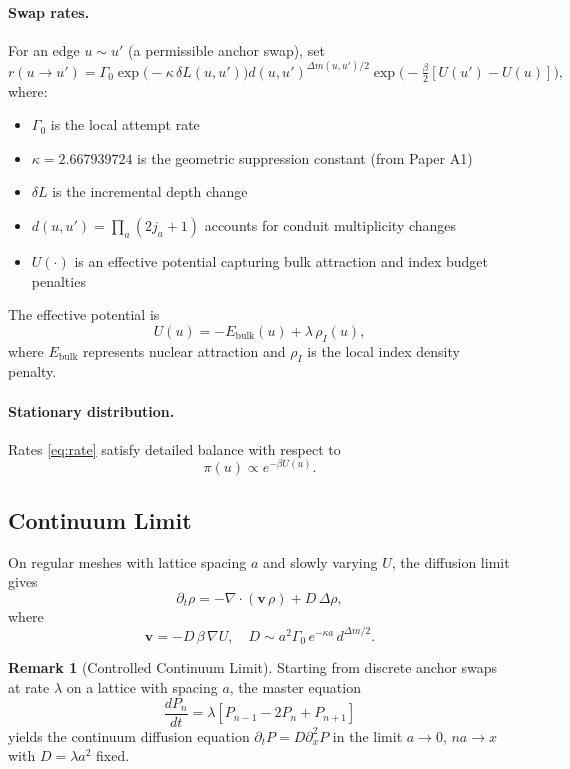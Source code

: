 \documentclass[11pt]{article}
\theoremstyle{plain}
\theoremstyle{definition}
\newtheorem{remark}[theorem]{Remark}
\begin{document}
\paragraph{Swap rates.}
For an edge $u\sim u'$ (a permissible anchor swap), set
\begin{equation}
  r(u\to u') = \Gamma_0 \exp\!\Big(-\kappa\,\delta L(u,u')\Big) d(u,u')^{\Delta m(u,u')/2} \exp\!\Big(-\tfrac{\beta}{2}[U(u')-U(u)]\Big),
  \label{eq:rate}
\end{equation}
where:
\begin{itemize}
  \item $\Gamma_0$ is the local attempt rate
  \item $\kappa = 2.667939724$ is the geometric suppression constant (from Paper A1)
  \item $\delta L$ is the incremental depth change
  \item $d(u,u')=\prod_a(2j_a+1)$ accounts for conduit multiplicity changes
  \item $U(\cdot)$ is an effective potential capturing bulk attraction and index budget penalties
\end{itemize}

The effective potential is
\[
  U(u) = -E_{\mathrm{bulk}}(u) + \lambda\,\rho_I(u),
\]
where $E_{\mathrm{bulk}}$ represents nuclear attraction and $\rho_I$ is the local index density penalty.

\paragraph{Stationary distribution.}
Rates \eqref{eq:rate} satisfy detailed balance with respect to
\[
  \pi(u) \propto e^{-\beta U(u)}.
\]

\subsection{Continuum Limit}

On regular meshes with lattice spacing $a$ and slowly varying $U$, the diffusion limit gives
\begin{equation}
  \partial_t \rho = -\nabla\cdot(\mathbf{v}\,\rho) + D\,\Delta \rho,
  \label{eq:fokker-planck}
\end{equation}
where
\[
  \mathbf{v} = -D\,\beta\,\nabla U, \quad D \sim a^2 \Gamma_0\,e^{-\kappa a}\, d^{\Delta m/2}.
\]

\begin{remark}[Controlled Continuum Limit]
  Starting from discrete anchor swaps at rate $\lambda$ on a lattice with spacing $a$, the master equation
  \begin{equation}
    \frac{dP_n}{dt} = \lambda [P_{n-1} - 2P_n + P_{n+1}]
  \end{equation}
  yields the continuum diffusion equation $\partial_t P = D \partial_x^2 P$ in the limit $a\to 0$, $na \to x$ with $D = \lambda a^2$ fixed.
\end{remark}
\end{document}
